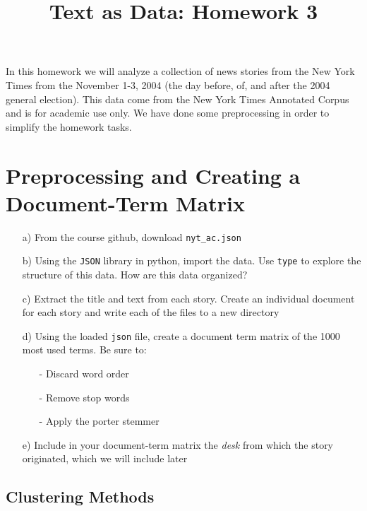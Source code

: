 \documentclass[12pt,letterpaper]{article}
\title{Text as Data: Homework 3}
\begin{document}
\maketitle

In this homework we will analyze a collection of news stories from the New York Times from the November 1-3, 2004 (the day before, of, and after the 2004 general election). This data come from the New York Times Annotated Corpus and is for academic use only. We have done some preprocessing in order to simplify the homework tasks.


\section{Preprocessing and Creating a Document-Term Matrix}

\begin{itemize}
\item[a)] From the course github, download {\tt nyt\_ac.json} 
\item[b)] Using the {\tt JSON} library in python, import the data. Use {\tt type} to explore the structure of this data. How are this data organized?
\item[c)] Extract the title and text from each story.  Create an individual document for each story and write each of the files to a new directory 
\item[d)] Using the loaded {\tt json} file, create a document term matrix of the 1000 most used terms.  Be sure to: 
\begin{itemize}
\item[-] Discard word order
\item[-] Remove stop words
\item[-] Apply the porter stemmer
\end{itemize}
\item[e)] Include in your document-term matrix the \emph{desk} from which the story originated, which we will include later
\end{itemize}

\subsection*{Clustering Methods}
\end{document}

